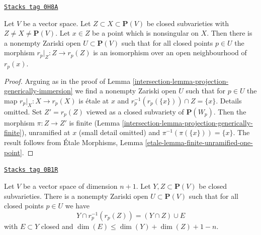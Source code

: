 \begin{lemma}
\label{intersection-lemma-projection-generically-immersion-refined}
\href{https://stacks.math.columbia.edu/tag/0H8A}{\texttt{Stacks tag 0H8A}}

Let $V$ be a vector space. Let $Z \subset X \subset \mathbf{P}(V)$ be closed
subvarieties with $Z \not = X \not = \mathbf{P}(V)$. Let $x \in Z$ be a point
which is nonsingular on $X$. Then there is a nonempty Zariski open
$U \subset \mathbf{P}(V)$ such that for all closed points $p \in U$ the
morphism $r_p|_Z : Z \to r_p(Z)$ is an isomorphism over an open neighbourhood
of $r_p(x)$.
\end{lemma}

\begin{proof}

Arguing as in the proof of Lemma \ref{intersection-lemma-projection-generically-immersion}
we find a nonempty Zariski open $U$ such that for $p \in U$ the map
$r_p|_X : X \to r_p(X)$ is \'etale at $x$ and
$r_p^{-1}(r_p(\{x\})) \cap Z = \{x\}$. Details omitted.
Set $Z' = r_p(Z)$ viewed as a closed subvariety of $\mathbf{P}(W_p)$.
Then the morphism $\pi : Z \to Z'$ is finite
(Lemma \ref{intersection-lemma-projection-generically-finite}), unramified at $x$
(small detail omitted) and $\pi^{-1}(\pi(\{x\})) = \{x\}$. The result follows
from \'Etale Morphisms, Lemma \ref{etale-lemma-finite-unramified-one-point}.
\end{proof}

\begin{lemma}
\label{intersection-lemma-projection-injective}
\href{https://stacks.math.columbia.edu/tag/0B1R}{\texttt{Stacks tag 0B1R}}

Let $V$ be a vector space of dimension $n + 1$.
Let $Y, Z \subset \mathbf{P}(V)$ be closed subvarieties.
There is a nonempty Zariski open $U \subset \mathbf{P}(V)$
such that for all closed points $p \in U$ we have
$$
Y \cap r_p^{-1}(r_p(Z)) = (Y \cap Z) \cup E
$$
with $E \subset Y$ closed and
$\dim(E) \leq \dim(Y) + \dim(Z) + 1 - n$.
\end{lemma}

